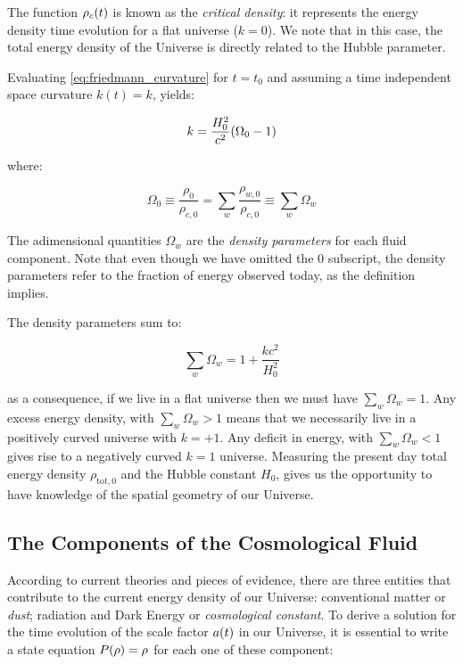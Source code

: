 The function $\rho_c\qty(t)$ is known as the \emph{critical density}: it
represents the energy density time evolution for a flat universe ($k = 0$).
We note that in this case, the total energy density of the Universe is
directly related to the Hubble parameter.

Evaluating \autoref{eq:friedmann_curvature} for $t = t_0$ and assuming a
time independent space curvature $k(t) = k$, yields:

\begin{equation}
        k = \frac{H^2_0}{c^2} \qty(\Omega_0 - 1) \\
\end{equation}

where:

\begin{equation}
        \Omega_0 \equiv \frac{\rho_0}{\rho_{c,0}} = \sum_w
        \frac{\rho_{w,0}}{\rho_{c,0}} \equiv \sum_w \Omega_w
\end{equation}

The adimensional quantities $\Omega_w$ are the \emph{density parameters}
for each fluid component. Note that even though we have omitted the $0$
subscript, the density parameters refer to the fraction of energy observed
today, as the definition implies.

The density parameters sum to:

\begin{equation}
        \sum_w \Omega_w = 1 + \frac{kc^2}{H^2_0}
\end{equation}

as a consequence, if we live in a flat universe then we must have $\sum_w
\Omega_w = 1$. Any excess energy density, with $\sum_w \Omega_w > 1$ means
that we necessarily live in a positively curved universe with $k = +1$. Any
deficit in energy, with $\sum_w \Omega_w < 1$ gives rise to a negatively
curved $k = 1$ universe. Measuring the present day total energy density
$\rho_{\text{tot},0}$ and the Hubble constant $H_0$, gives us the
opportunity to have knowledge of the spatial geometry of our Universe.

\subsection{The Components of the Cosmological Fluid}

According to current theories and pieces of evidence, there are three
entities that contribute to the current energy density of our Universe:
conventional matter or \emph{dust}; radiation and Dark Energy or
\emph{cosmological constant}.
To derive a solution for the time evolution of the scale factor $a\qty(t)$
in our Universe, it is essential to write a state equation
$P\qty(\rho) = \rho$ for each one of these component:


